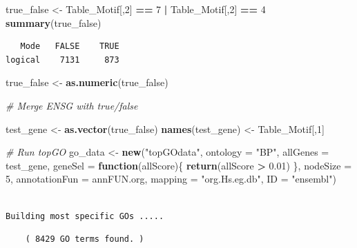 \documentclass[]{article}
\newenvironment{Shaded}{\begin{snugshade}}{\end{snugshade}}
\newcommand{\KeywordTok}[1]{\textcolor[rgb]{0.13,0.29,0.53}{\textbf{#1}}}
\newcommand{\DataTypeTok}[1]{\textcolor[rgb]{0.13,0.29,0.53}{#1}}
\newcommand{\DecValTok}[1]{\textcolor[rgb]{0.00,0.00,0.81}{#1}}
\newcommand{\FloatTok}[1]{\textcolor[rgb]{0.00,0.00,0.81}{#1}}
\newcommand{\StringTok}[1]{\textcolor[rgb]{0.31,0.60,0.02}{#1}}
\newcommand{\CommentTok}[1]{\textcolor[rgb]{0.56,0.35,0.01}{\textit{#1}}}
\newcommand{\ControlFlowTok}[1]{\textcolor[rgb]{0.13,0.29,0.53}{\textbf{#1}}}
\newcommand{\OperatorTok}[1]{\textcolor[rgb]{0.81,0.36,0.00}{\textbf{#1}}}
\newcommand{\NormalTok}[1]{#1}
\begin{document}
\begin{Shaded}
\begin{Highlighting}[]
\NormalTok{true_false <-}\StringTok{ }\NormalTok{Table_Motif[,}\DecValTok{2}\NormalTok{] }\OperatorTok{==}\StringTok{ }\DecValTok{7} \OperatorTok{|}\StringTok{ }\NormalTok{Table_Motif[,}\DecValTok{2}\NormalTok{] }\OperatorTok{==}\StringTok{ }\DecValTok{4}
\KeywordTok{summary}\NormalTok{(true_false)}
\end{Highlighting}
\end{Shaded}

\begin{verbatim}
   Mode   FALSE    TRUE 
logical    7131     873 
\end{verbatim}

\begin{Shaded}
\begin{Highlighting}[]
\NormalTok{true_false <-}\StringTok{ }\KeywordTok{as.numeric}\NormalTok{(true_false)}


\CommentTok{# Merge ENSG with true/false}

\NormalTok{test_gene <-}\StringTok{ }\KeywordTok{as.vector}\NormalTok{(true_false)}
\KeywordTok{names}\NormalTok{(test_gene) <-}\StringTok{ }\NormalTok{Table_Motif[,}\DecValTok{1}\NormalTok{]}

\CommentTok{# Run topGO}
\NormalTok{go_data <-}\StringTok{ }\KeywordTok{new}\NormalTok{(}\StringTok{"topGOdata"}\NormalTok{,}
                   \DataTypeTok{ontology =} \StringTok{"BP"}\NormalTok{,}
                   \DataTypeTok{allGenes =}\NormalTok{ test_gene, }
                    \DataTypeTok{geneSel =} \ControlFlowTok{function}\NormalTok{(allScore)\{}
    \KeywordTok{return}\NormalTok{(allScore }\OperatorTok{>}\StringTok{ }\FloatTok{0.01}\NormalTok{)}
\NormalTok{\},}
                   \DataTypeTok{nodeSize =} \DecValTok{5}\NormalTok{,}
                   \DataTypeTok{annotationFun =}\NormalTok{ annFUN.org,}
                   \DataTypeTok{mapping =} \StringTok{"org.Hs.eg.db"}\NormalTok{,}
                   \DataTypeTok{ID =} \StringTok{"ensembl"}\NormalTok{)}
\end{Highlighting}
\end{Shaded}

\begin{verbatim}

Building most specific GOs .....
\end{verbatim}

\begin{verbatim}
    ( 8429 GO terms found. )
\end{verbatim}
\end{document}
